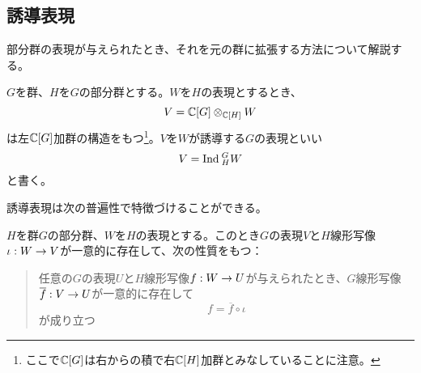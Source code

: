 \documentclass{ltjsreport}
\begin{document}
\subsection{誘導表現}

部分群の表現が与えられたとき、それを元の群に拡張する方法について解説する。

\begin{defin}\label{ind_rep}
  $G$を群、$H$を$G$の部分群とする。$W$を$H$の表現とするとき、
  \[
  V=\mathbb{C}[G]\otimes_{\mathbb{C}[H]}W 
  \]
  は左$\mathbb{C}[G]$加群の構造をもつ\footnote{
    ここで$\mathbb{C}[G]$は右からの積で右$\mathbb{C}[H]$加群とみなしていることに注意。}。$V$を$W$が誘導する$G$の表現といい
  \[
  V=\text{Ind}\:_H^GW  
  \]
  と書く。
\end{defin}

誘導表現は次の普遍性で特徴づけることができる。

\begin{theo}[誘導表現の普遍性]\label{univ_ind_rep}
  $H$を群$G$の部分群、$W$を$H$の表現とする。このとき$G$の表現$V$と$H$線形写像$\iota:W\rightarrow V$が一意的に存在して、次の性質をもつ：
  \begin{quote}
    任意の$G$の表現$U$と$H$線形写像$f:W\rightarrow U$が与えられたとき、$G$線形写像$\overline{f}:V\rightarrow U$が一意的に存在して
    \[
    f=\overline{f}\circ\iota  
    \]
    が成り立つ
  \end{quote}
\end{theo}
\end{document}
